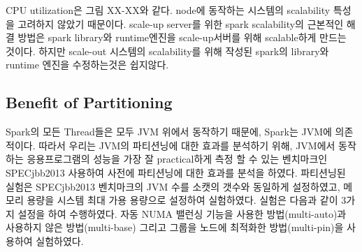 \fi





\ifkor
CPU utilization은 그림 XX-XX와 같다. 
node에 동작하는 시스템의 scalability 특성을 고려하지 않았기 때문이다. 
scale-up server를 위한 spark scalability의 근본적인 해결 방법은 spark library와 
runtime엔진을 scale-up서버를 위해 scalable하게 만드는 것이다.
하지만 scale-out 시스템의 scalability를 위해 작성된 spark의 library와 runtime 엔진을 
수정하는것은 쉽지않다.
\else

\fi


\ifkor
\else

\fi



\subsection{Benefit of Partitioning}


\ifkor
Spark의 모든 Thread들은 모두 JVM 위에서 동작하기 때문에, Spark는 JVM에 의존적이다.
따라서 우리는 JVM의 파티션닝에 대한 효과를 분석하기 위해, JVM에서 동작하는 응용프로그램의
성능을 가장 잘 practical하게 측정 할 수 있는 벤치마크인 SPECjbb2013 사용하여 사전에 
파티션닝에 대한 효과를 분석을 하였다. 
파티션닝된  실험은 SPECjbb2013 벤치마크의 JVM 수를 소캣의 갯수와 동일하게 설정하였고, 
메모리 용량을 시스템 최대 가용 용량으로 설정하여 실험하였다. 
실험은 다음과 같이 3가지 설정을 하여 수행하였다. 
자동 NUMA 밸런싱 기능을 사용한 방법(multi-auto)과 사용하지 않은 
방법(multi-base) 그리고 그룹을 노드에 최적화한 방법(multi-pin)을 
사용하여 실험하였다.

